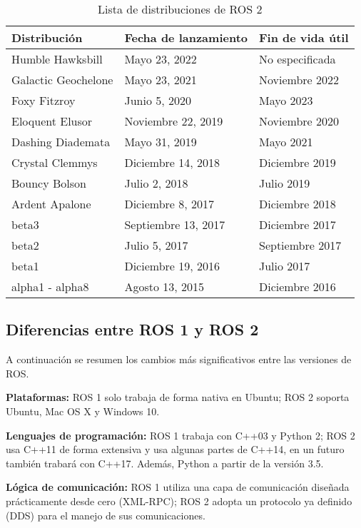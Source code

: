\begin{table}
    \centering
    \begin{tabular}{||l|l|l||}
        \hline
        Distribución & Fecha de lanzamiento & Fin de vida útil\\
        \hline
        Humble Hawksbill & Mayo 23, 2022 & No especificada\\
        Galactic Geochelone & Mayo 23, 2021 & Noviembre 2022\\
        Foxy Fitzroy & Junio 5, 2020 & Mayo 2023\\
        Eloquent Elusor & Noviembre  22, 2019 & Noviembre 2020\\
        Dashing Diademata & Mayo 31, 2019 & Mayo 2021\\
        Crystal Clemmys & Diciembre 14, 2018 & Diciembre 2019\\
        Bouncy Bolson & Julio 2, 2018 & Julio 2019\\
        Ardent Apalone & Diciembre 8, 2017 & Diciembre 2018\\
        beta3 & Septiembre 13, 2017 & Diciembre 2017\\
        beta2 & Julio 5, 2017 & Septiembre 2017\\
        beta1 & Diciembre 19, 2016 & Julio 2017\\
        alpha1 - alpha8 & Agosto 13, 2015 & Diciembre 2016\\
        \hline
    \end{tabular}
    \caption{Lista de distribuciones de ROS 2}
    \label{tab:rosd}
\end{table}

\subsection{Diferencias entre ROS 1 y ROS 2}
A continuación se resumen los cambios más significativos entre las versiones de ROS.

\textbf{Plataformas:} ROS 1 solo trabaja de forma nativa en Ubuntu; ROS 2 soporta Ubuntu, Mac OS X y Windows 10.

\textbf{Lenguajes de programación:} ROS 1 trabaja con C++03 y Python 2; ROS 2 usa C++11 de forma extensiva y usa algunas partes de C++14,  en un futuro también trabará con C++17. Además, Python a partir de la versión 3.5.

\textbf{Lógica de comunicación:} ROS 1 utiliza una capa de comunicación diseñada prácticamente desde cero (XML-RPC); ROS 2 adopta un protocolo ya definido (DDS) para el manejo de sus comunicaciones.

